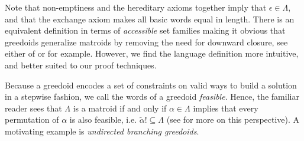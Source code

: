 \documentclass[11pt]{article}
\newcommand{\univ}{\Sigma}
\newcommand{\glang}{\Lambda}
\begin{document}
Note that non-emptiness and the hereditary axioms together imply that $\epsilon \in \glang$, and that the exchange axiom makes all basic words equal in length.
There is an equivalent definition in terms of \emph{accessible} set families making it obvious that greedoids generalize matroids by removing the need for downward closure, see either of \cite{bjorner1992introduction} or \cite{korte2012greedoids} for example.
However, we find the language definition more intuitive, and better suited to our proof techniques.

Because a greedoid encodes a set of constraints on valid ways to build a solution in a stepwise fashion, we call the words of a greedoid \emph{feasible}.
Hence, the familiar reader sees that $\glang$ is a matroid if and only if $\alpha \in \glang$ implies that every permutation of $\alpha$ is also feasible, i.e. $\widetilde{\alpha}! \subseteq \glang$ (see \cite{brylawski1988exchange} for more on this perspective).
A motivating example is \emph{undirected branching greedoids}.
\end{document}
